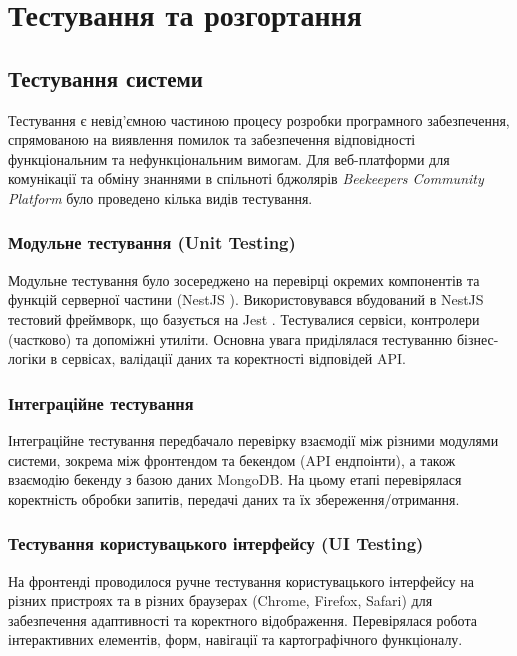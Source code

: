 \chapter{Тестування та розгортання}
\label{ch:testing_deployment}

\section{Тестування системи}
\label{sec:testing}
Тестування є невід'ємною частиною процесу розробки програмного забезпечення, спрямованою на виявлення помилок та забезпечення відповідності функціональним та нефункціональним вимогам. Для веб-платформи для комунікації та обміну знаннями в спільноті бджолярів \textit{Beekeepers Community Platform} було проведено кілька видів тестування.

\subsection{Модульне тестування (Unit Testing)}
Модульне тестування було зосереджено на перевірці окремих компонентів та функцій серверної частини (NestJS \cite{nestjs}). Використовувався вбудований в NestJS тестовий фреймворк, що базується на Jest \cite{jestjs}. Тестувалися сервіси, контролери (частково) та допоміжні утиліти. Основна увага приділялася тестуванню бізнес-логіки в сервісах, валідації даних та коректності відповідей API.

\subsection{Інтеграційне тестування}
Інтеграційне тестування передбачало перевірку взаємодії між різними модулями системи, зокрема між фронтендом та бекендом (API ендпоінти), а також взаємодію бекенду з базою даних MongoDB. На цьому етапі перевірялася коректність обробки запитів, передачі даних та їх збереження/отримання.

\subsection{Тестування користувацького інтерфейсу (UI Testing)}
На фронтенді проводилося ручне тестування користувацького інтерфейсу на різних пристроях та в різних браузерах (Chrome, Firefox, Safari) для забезпечення адаптивності та коректного відображення. Перевірялася робота інтерактивних елементів, форм, навігації та картографічного функціоналу.

